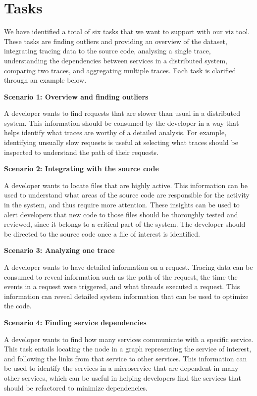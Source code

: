 \section{Tasks}

We have identified a total of six tasks that we want to support with our viz tool. These tasks
are finding outliers and providing an overview of the dataset, integrating tracing data to the source
code, analysing a single trace, understanding the dependencies between services in a distributed system,
comparing two traces, and aggregating multiple traces. Each task is clarified through an example below.

\textbf{Scenario 1: Overview and finding outliers}

A developer wants to find requests that are slower than usual in a distributed system. This information should be consumed by the developer in a way
that helps identify what traces are worthy of a detailed analysis. For example, identifying unsually slow requests is useful at selecting what traces
should be inspected to understand the path of their requests.

\textbf{Scenario 2: Integrating with the source code}

A developer wants to locate files that are highly active. This information can be used to understand what areas of the source code are responsible
for the activity in the system, and thus require more attention. These insights can be used to alert developers that new code to those files should
be thoroughly tested and reviewed, since it belongs to a critical part of the system. The developer should be directed to the source code once a file of
interest is identified.

\textbf{Scenario 3: Analyzing one trace}

A developer wants to have detailed information on a request. Tracing data can be consumed to reveal information such as the path of the request, the 
time the events in a request were triggered, and what threads executed a request. This information can reveal detailed system information that can be
used to optimize the code.

\textbf{Scenario 4: Finding service dependencies}

A developer wants to find how many services communicate with a specific service. This task entails locating the node in a graph representing the service of interest,
and following the links from that service to other services. This information can be used to identify the services in a microservice that are dependent in many other
services, which can be useful in helping developers find the services that should be refactored to minimize dependencies.

